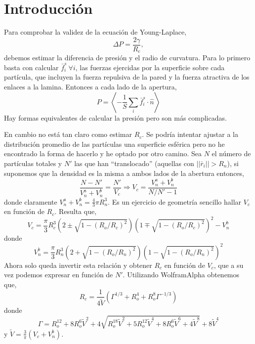\chapter{Introducción}
\label{cap:introduction}

Para comprobar la validez de la ecuación de Young-Laplace,
\begin{equation}
  \Delta P=\frac{2\gamma}{R_c},
\end{equation}
debemos estimar la diferencia de presión y el radio de curvatura. Para lo primero basta con calcular $\bar{f}^s_i \ \forall i$, las fuerzas ejercidas por la superficie sobre cada partícula, que incluyen la fuerza repulsiva de la pared y la fuerza atractiva de los enlaces a la lamina. Entonces a cada lado de la apertura,
\begin{equation}
  P=\left\langle-\frac{1}{S}\sum_i\bar{f}^s_i\cdot\hat{n}\right\rangle
\end{equation}
Hay formas equivalentes de calcular la presión pero son más complicadas.

En cambio no está tan claro como estimar $R_c$. Se podría intentar ajustar a la distribución promedio de las partículas una superficie esférica pero no he encontrado la forma de hacerlo y he optado por otro camino. Sea $N$ el número de partículas totales y $N'$ las que han ``translocado'' (aquellas con $||\bar{r}_i||>R_n$), si suponemos que la densidad es la misma a ambos lados de la abertura entonces,
\begin{equation}
  \frac{N-N'}{V_n^a+V_n^b}=\frac{N'}{V_c}\Rightarrow V_c=\frac{V_n^a+V_n^b}{N/N'-1}
\end{equation}
donde claramente $V_n^a+V_n^b=\tfrac{4}{3}\pi R_n^3$. Es un ejercicio de geometría sencillo hallar $V_c$ en función de $R_c$. Resulta que,
\begin{equation}
  V_c=\frac{\pi}{3}R_c^3\left(2\pm\sqrt{1-(R_o/R_c)^2}\right)\left(1\mp\sqrt{1-(R_o/R_c)^2}\right)^2-V_n^b
\end{equation}
donde
\begin{equation}
  V_n^b=\frac{\pi}{3}R_n^3\left(2+\sqrt{1-(R_o/R_n)^2}\right)\left(1-\sqrt{1-(R_o/R_n)^2}\right)^2
\end{equation}
Ahora solo queda invertir esta relación y obtener $R_c$ en función de $V_c$, que a su vez podemos expresar en función de $N'$. Utilizando WolframAlpha obtenemos que,
\begin{equation}
  R_c=\frac{1}{4\tilde{V}}\left(\Gamma^{1/3}+R_o^4+R_o^8\Gamma^{-1/3}\right)
\end{equation}
donde
\begin{equation}
  \Gamma=R_o^{12}+8R_o^6\tilde{V}^2+4\sqrt{R_o^{18}\tilde{V}^2+5R_o^{12}\tilde{V}^4+8R_o^6\tilde{V}^6+4\tilde{V}^8}+8\tilde{V}^4
\end{equation}
y $\tilde{V}=\frac{3}{\pi}\left(V_c+V_n^b\right)$.

